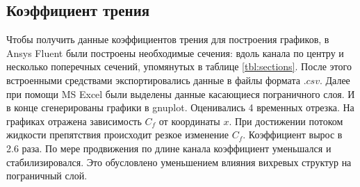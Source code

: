 \subsection{Коэффициент трения}
	Чтобы получить данные коэффициентов трения для построения графиков, в Ansys Fluent были построены необходимые сечения: вдоль канала по центру и несколько поперечных сечений, упомянутых в таблице \ref{tbl:sections}. После этого встроенными средствами экспортировались данные в файлы формата $.csv$. Далее при помощи MS Excel были выделены данные касающиеся пограничного слоя. И в конце сгенерированы графики в gnuplot. 
	Оценивались 4 временных отрезка. На графиках отражена зависимость $C_f$ от координаты $x$. При достижении потоком жидкости препятствия происходит резкое изменение $C_f$. Коэффициент вырос в 2.6 раза. По мере продвижения по длине канала коэффициент уменьшался и стабилизировался. Это обусловлено уменьшением влияния вихревых структур на пограничный слой.
